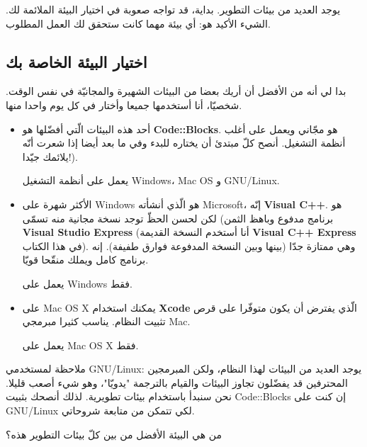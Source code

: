 يوجد العديد من بيئات التطوير. بداية، قد تواجه صعوبة في اختيار البيئة الملائمة لك. الشيء الأكيد هو: أي بيئة مهما كانت ستحقق لك العمل المطلوب.

\subsection{اختيار البيئة الخاصة بك}

بدا لي أنه من الأفضل أن أريك بعضا من البيئات الشهيرة والمجانيّة في نفس الوقت. شخصيّا، أنا أستخدمها جميعا وأختار في كل يوم  واحدا منها.

\begin{itemize}
  \item أحد هذه البيئات الّتي أفضّلها هو
\textbf{\textenglish{Code::Blocks}}.
هو مجّاني ويعمل على أغلب أنظمة التشغيل. أنصح كلّ مبتدئ أن يختاره للبدء  وفي ما بعد أيضا إذا شعرت أنّه يلائمك جيّدا!).

يعمل على أنظمة التشغيل
\textenglish{Windows}،
\textenglish{Mac OS}
و
\textenglish{GNU/Linux}.
  \item الأكثر شهرة على
\textenglish{Windows}
هو الّذي أنشأته
\textenglish{Microsoft}،
إنّه
\textbf{\textenglish{Visual C++}}.
هو برنامج مدفوع  وباهظ الثمن) لكن لحسن الحظّ توجد نسخة مجانية منه تسمّى
\textbf{\textenglish{Visual Studio Express}}
(أنا أستخدم النسخة القديمة
\textbf{\textenglish{Visual C++ Express}}
في هذا الكتاب). وهي ممتازة جدّا (بينها وبين النسخة المدفوعة فوارق طفيفة). إنه برنامج كامل ويملك منقّحا قويّا.

يعمل على
\textenglish{Windows}
فقط.
  \item على
\textenglish{Mac OS X}
يمكنك استخدام
\textbf{\textenglish{Xcode}}
الّذي يفترض أن يكون متوفّرا على قرص تثبيت النظام. يناسب كثيرا مبرمجي
\textenglish{Mac}.

يعمل على
\textenglish{Mac OS X}
فقط.
\end{itemize}

\begin{information}
  ملاحظة لمستخدمي
  \textenglish{GNU/Linux}:
  يوجد العديد من البيئات لهذا النظام، ولكن المبرمجين المحترفين قد يفضّلون تجاوز البيئات والقيام بالترجمة "يدويّا"، وهو شيء أصعب قليلا. نحن سنبدأ باستخدام بيئات تطويرية. لذلك أنصحك بثبيت
  \textenglish{Code::Blocks}
  إن كنت على
  \textenglish{GNU/Linux}
  لكي تتمكن من متابعة شروحاتي.
\end{information}

\begin{question}
من هي البيئة الأفضل من بين كلّ بيئات التطوير هذه؟
\end{question}

